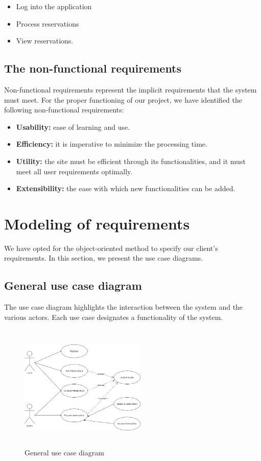 \begin{itemize}
    \item Log into the application
    \item Process reservations
    \item View reservations.

\end{itemize}

\subsection{The non-functional requirements }

Non-functional requirements represent the implicit requirements that the system must meet. For the proper functioning of our project, we have identified the following non-functional requirements:

\begin{itemize}
    \item \textbf{Usability:} ease of learning and use.
    \item \textbf{Efficiency:} it is imperative to minimize the processing time.
    \item \textbf{Utility:} the site must be efficient through its functionalities, and it 
        must meet all user requirements optimally. 
        \item \textbf{Extensibility:} the ease with which new functionalities can be added. 
\end{itemize}
 
\section{Modeling of requirements }

We have opted for the object-oriented method to specify our client's requirements. In this section, we present the use case diagrams.

\subsection{General use case diagram }

 The use case diagram highlights the interaction between the system and the various actors. Each use case designates a functionality of the system. 
\begin{figure}[H]
   \centering
    \includegraphics[width=6cm,height=6cm]{images/usecase.drawio.png}
    \caption{General use case diagram}
    \label{General use case diagram}
\end{figure}

